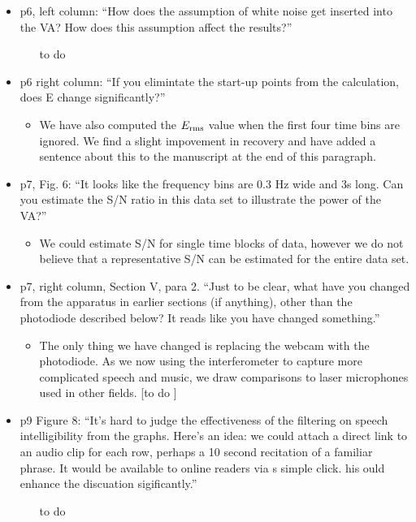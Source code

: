 \documentclass[a4paper, 10pt]{letter}
\begin{document}
\begin{itemize}
\item p6, left column: ``How does the assumption of white noise get inserted into the VA? How does this assumption affect the results?'' 
\begin{itemize}
\item [to do]
\end{itemize}

\item p6 right column: ``If you elimintate the start-up points from the calculation, does E change significantly?''
\begin{itemize}
\item We have also computed the $E_{\rm rms}$ value when the first four time bins are ignored. We find a slight impovement in recovery and have added a sentence about this to the manuscript at the end of this paragraph. 
\end{itemize}

\item p7, Fig. 6: ``It looks like the frequency bins are 0.3 Hz wide and 3s long. Can you estimate the S/N ratio in this data set to illustrate the power of the VA?''
\begin{itemize}
\item We could estimate S/N for single time blocks of data, however we do not believe that a representative S/N can be estimated for the entire data set. 
\end{itemize}

\item p7, right column, Section V, para 2. ``Just to be clear, what have you changed from the apparatus in earlier sections (if anything), other than the photodiode described below? It reads like you have changed something.''
\begin{itemize}
\item The only thing we have changed is replacing the webcam with the photodiode. As we now using the interferometer to capture more complicated speech and music, we draw comparisons to laser microphones used in other fields.  [to do ]
\end{itemize}

\item p9 Figure 8: ``It's hard to judge the effectiveness of the filtering on speech intelligibility from the graphs. Here's an idea: we could attach a direct link to an audio clip for each row, perhaps a 10 second recitation of a familiar phrase. It would be available to online readers via s simple click. his ould enhance the discuation sigificantly.''
\begin{itemize}
\item [to do ]
\end{itemize}


\end{itemize}
\end{document}
